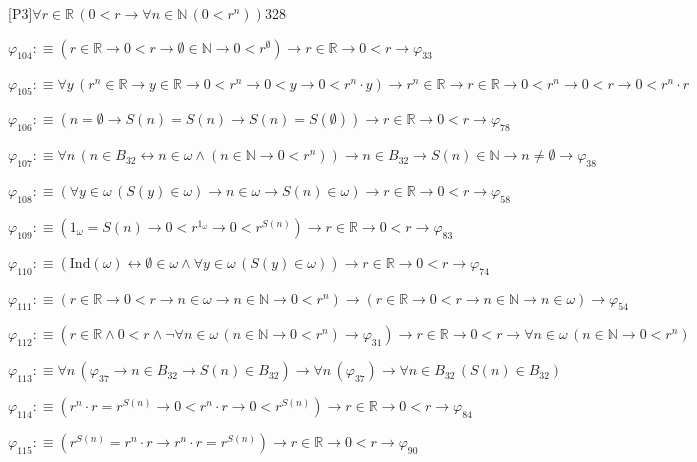 \begin{fullproof}{[P3]}{$\forall r \in \mathbb{R}\,(0 < r \to \forall n \in \mathbb{N}\,(0 < {{r}^{n}}))$}{328}
\begin{abbrevlist}
\item $\varphi_{104} :\equiv (r \in \mathbb{R} \to 0 < r \to \emptyset \in \mathbb{N} \to 0 < {{r}^{\emptyset}}) \to r \in \mathbb{R} \to 0 < r \to \varphi_{33}$
\item $\varphi_{105} :\equiv \forall y\,({{r}^{n}} \in \mathbb{R} \to y \in \mathbb{R} \to 0 < {{r}^{n}} \to 0 < y \to 0 < {{r}^{n}} \cdot y) \to {{r}^{n}} \in \mathbb{R} \to r \in \mathbb{R} \to 0 < {{r}^{n}} \to 0 < r \to 0 < {{r}^{n}} \cdot r$
\item $\varphi_{106} :\equiv (n = \emptyset \to S(n) = S(n) \to S(n) = S(\emptyset)) \to r \in \mathbb{R} \to 0 < r \to \varphi_{78}$
\item $\varphi_{107} :\equiv \forall n\,(n \in B_{32} \leftrightarrow n \in \omega \land (n \in \mathbb{N} \to 0 < {{r}^{n}})) \to n \in B_{32} \to S(n) \in \mathbb{N} \to n \neq \emptyset \to \varphi_{38}$
\item $\varphi_{108} :\equiv (\forall y \in \omega\,(S(y) \in \omega) \to n \in \omega \to S(n) \in \omega) \to r \in \mathbb{R} \to 0 < r \to \varphi_{58}$
\item $\varphi_{109} :\equiv (1_{\omega} = S(n) \to 0 < {{r}^{1_{\omega}}} \to 0 < {{r}^{S(n)}}) \to r \in \mathbb{R} \to 0 < r \to \varphi_{83}$
\item $\varphi_{110} :\equiv (\mathrm{Ind}(\omega) \leftrightarrow \emptyset \in \omega \land \forall y \in \omega\,(S(y) \in \omega)) \to r \in \mathbb{R} \to 0 < r \to \varphi_{74}$
\item $\varphi_{111} :\equiv (r \in \mathbb{R} \to 0 < r \to n \in \omega \to n \in \mathbb{N} \to 0 < {{r}^{n}}) \to (r \in \mathbb{R} \to 0 < r \to n \in \mathbb{N} \to n \in \omega) \to \varphi_{54}$
\item $\varphi_{112} :\equiv (r \in \mathbb{R} \land 0 < r \land \neg \forall n \in \omega\,(n \in \mathbb{N} \to 0 < {{r}^{n}}) \to \varphi_{31}) \to r \in \mathbb{R} \to 0 < r \to \forall n \in \omega\,(n \in \mathbb{N} \to 0 < {{r}^{n}})$
\item $\varphi_{113} :\equiv \forall n\,(\varphi_{37} \to n \in B_{32} \to S(n) \in B_{32}) \to \forall n\,(\varphi_{37}) \to \forall n \in B_{32}\,(S(n) \in B_{32})$
\item $\varphi_{114} :\equiv ({{r}^{n}} \cdot r = {{r}^{S(n)}} \to 0 < {{r}^{n}} \cdot r \to 0 < {{r}^{S(n)}}) \to r \in \mathbb{R} \to 0 < r \to \varphi_{84}$
\item $\varphi_{115} :\equiv ({{r}^{S(n)}} = {{r}^{n}} \cdot r \to {{r}^{n}} \cdot r = {{r}^{S(n)}}) \to r \in \mathbb{R} \to 0 < r \to \varphi_{90}$

\end{abbrevlist}
\end{fullproof}
